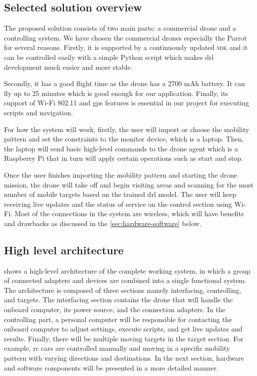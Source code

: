\documentclass[../main.tex]{subfiles}
\begin{document}
\subsection{Selected solution overview}\label{sec:selected-solution}

The proposed solution consists of two main parts: 
a commercial drone and a controlling system.
We have chosen the commercial drones especially 
the Parrot \anafi for several reasons.
Firstly, it is supported by a continuously updated 
\textsc{sdk} and it can be controlled easily 
with a simple Python script which makes 
\gls{drl} development much easier and more stable. 

Secondly, it has a good flight time 
as the \anafi drone has a 2700 mAh battery. 
It can fly up to 25 minutes which is good enough 
for our application.
Finally, its support of Wi-Fi 802.11 and \gls{gps} 
features is essential in our project for 
executing scripts and navigation. 

For how the system will work, firstly, the user 
will import or choose the mobility pattern and set
the constraints to the monitor device,
which is a laptop. Then, the laptop will send basic
high-level commands to the drone agent which is a
Raspberry Pi that in turn will apply certain
operations such as start and stop.

Once the user finishes importing the mobility pattern
and starting the drone mission, the drone will
take off and begin visiting areas and scanning for
the most number of mobile targets based on the
trained \gls{drl} model.
The user will keep receiving live updates and the
status of service on the control section using Wi-Fi.
Most of the connections in the system are wireless,
which will have benefits and drawbacks as discussed
in the \cref{sec:hardware-software} below.

\subsection{High level architecture}

 shows a high-level architecture 
of the complete working system, in which a group 
of connected adapters and devices are combined into 
a single functional system. 
The architecture is composed of three sections namely
interfacing, controlling, and targets. 
The interfacing section contains the drone that 
will handle the onboard computer, its power source, 
and the connection adapters. 
In the controlling part, a personal computer 
will be responsible for contacting the onboard computer 
to adjust settings, execute scripts, and get 
live updates and results. 
Finally, there will be multiple moving targets 
in the target section. For example, 
\gls{rc} cars are controlled manually and moving in 
a specific mobility pattern with varying directions 
and destinations. 
In the next section, hardware and software components 
will be presented in a more detailed manner.
\end{document}
